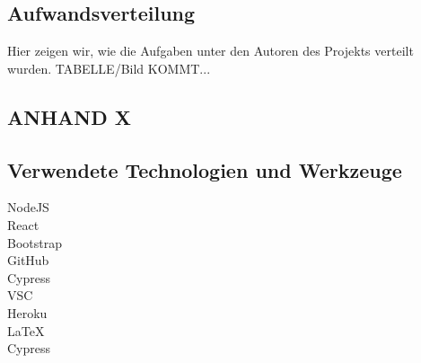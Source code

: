 \subsection{Aufwandsverteilung}\label{subsec_UabsAnhang}
Hier zeigen wir, wie die Aufgaben unter den Autoren des Projekts verteilt wurden.
TABELLE/Bild KOMMT...

\subsection{ANHAND X}\label{subsec_UabsAnhang}


\subsection{Verwendete Technologien und Werkzeuge}\label{subsec_UabsAnhang}
NodeJS
\\
React
\\
Bootstrap
\\
GitHub
\\
Cypress
\\
VSC
\\
Heroku
\\
LaTeX
\\
Cypress
